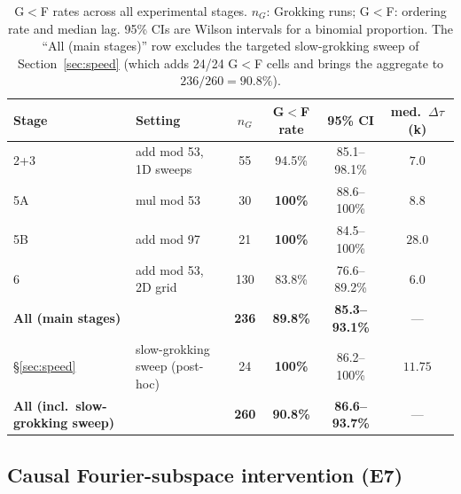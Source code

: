 \documentclass{article}
\newcommand{\Dtau}{\Delta\tau}
\begin{document}
\begin{table}[h]
  \centering
  \caption{G$<$F rates across all experimental stages.
    $n_G$: Grokking runs; G$<$F: ordering rate and median lag.
    95\% CIs are Wilson intervals for a binomial proportion.
    The ``All (main stages)'' row excludes the targeted
    slow-grokking sweep of Section~\ref{sec:speed} (which adds
    24/24 G$<$F cells and brings the aggregate to
    $236/260{=}90.8\%$).}
  \label{tab:summary_all}
  \small
  \begin{tabular}{llcccc}
    \toprule
    Stage & Setting & $n_G$ & G$<$F rate & 95\% CI & med.\ $\Dtau$ (k) \\
    \midrule
    2+3  & add mod 53, 1D sweeps & 55  & 94.5\%  & 85.1--98.1\% & $7.0$ \\
    5A   & mul mod 53            & 30  & \textbf{100\%}   & 88.6--100\% & $8.8$ \\
    5B   & add mod 97            & 21  & \textbf{100\%}   & 84.5--100\% & $28.0$ \\
    6    & add mod 53, 2D grid   & 130 & 83.8\%  & 76.6--89.2\% & $6.0$ \\
    \midrule
    \textbf{All (main stages)} & & \textbf{236} & \textbf{89.8\%} & \textbf{85.3--93.1\%} & --- \\
    \midrule
    \S\ref{sec:speed} & slow-grokking sweep (post-hoc) & 24  & \textbf{100\%}   & 86.2--100\% & $11.75$ \\
    \midrule
    \textbf{All (incl.\ slow-grokking sweep)} & & \textbf{260} & \textbf{90.8\%} & \textbf{86.6--93.7\%} & --- \\
    \bottomrule
  \end{tabular}
\end{table}
\FloatBarrier

\subsection{Causal Fourier-subspace intervention (E7)}
\label{sec:e7_intervention}
\end{document}
